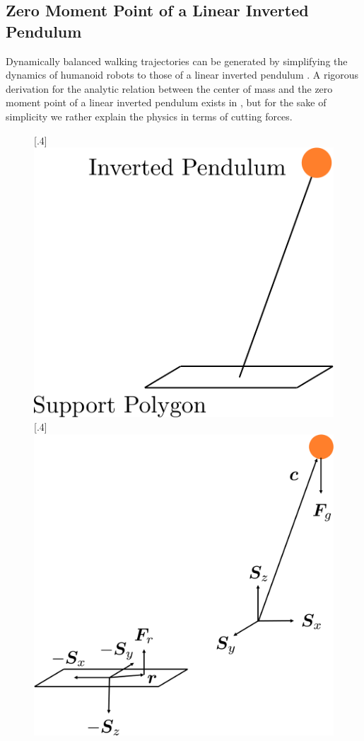 \subsection{Zero Moment Point of a Linear Inverted Pendulum}
Dynamically balanced walking trajectories can be generated by simplifying the dynamics of humanoid robots to those of a linear inverted pendulum \cite{kajita2003biped}. A rigorous derivation for the analytic relation between the center of mass and the zero moment point of a linear inverted pendulum exists in \cite{kajita2014introduction}, but for the sake of simplicity we rather explain the physics in terms of cutting forces. 
\begin{figure}[h!]
	\centering
	\subcaptionbox{}%
	[.4\linewidth]{\includegraphics[scale=.3]{chapters/02_foundations_for_humanoid_walking/img/inverted_pendulum.png}}
	\subcaptionbox{}%
	[.4\linewidth]{\includegraphics[scale=.3]{chapters/02_foundations_for_humanoid_walking/img/inverted_pendulum_free_body_diagram.png}}

\end{figure}
